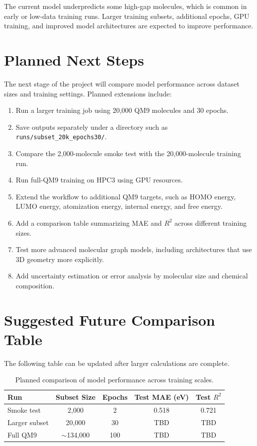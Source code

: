 \documentclass[11pt]{article}
\begin{document}
The current model underpredicts some high-gap molecules, which is common in early or low-data training runs. Larger training subsets, additional epochs, GPU training, and improved model architectures are expected to improve performance.

\section{Planned Next Steps}

The next stage of the project will compare model performance across dataset sizes and training settings. Planned extensions include:

\begin{enumerate}[leftmargin=1.5em]
    \item Run a larger training job using 20,000 QM9 molecules and 30 epochs.
    \item Save outputs separately under a directory such as \texttt{runs/subset\_20k\_epochs30/}.
    \item Compare the 2,000-molecule smoke test with the 20,000-molecule training run.
    \item Run full-QM9 training on HPC3 using GPU resources.
    \item Extend the workflow to additional QM9 targets, such as HOMO energy, LUMO energy, atomization energy, internal energy, and free energy.
    \item Add a comparison table summarizing MAE and $R^2$ across different training sizes.
    \item Test more advanced molecular graph models, including architectures that use 3D geometry more explicitly.
    \item Add uncertainty estimation or error analysis by molecular size and chemical composition.
\end{enumerate}

\section{Suggested Future Comparison Table}

The following table can be updated after larger calculations are complete.

\begin{table}[h!]
\centering
\begin{tabular}{lcccc}
\toprule
Run & Subset Size & Epochs & Test MAE (eV) & Test $R^2$ \\
\midrule
Smoke test & 2,000 & 2 & 0.518 & 0.721 \\
Larger subset & 20,000 & 30 & TBD & TBD \\
Full QM9 & $\sim$134,000 & 100 & TBD & TBD \\
\bottomrule
\end{tabular}
\caption{Planned comparison of model performance across training scales.}
\end{table}
\end{document}
